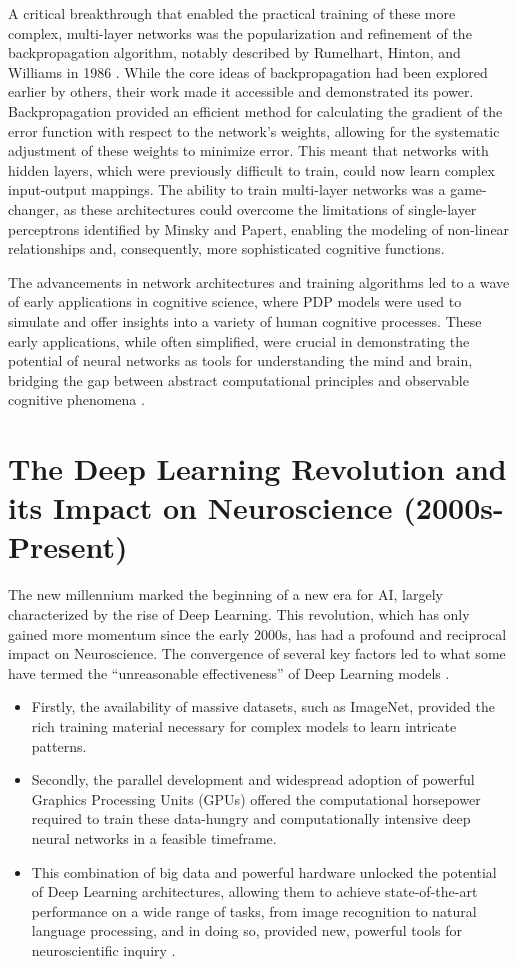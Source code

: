 A critical breakthrough that enabled the practical training of these more complex, multi-layer networks was the popularization and refinement of the backpropagation algorithm, notably described by Rumelhart, Hinton, and Williams in 1986 \cite{rumelhart1986learning}. While the core ideas of backpropagation had been explored earlier by others, their work made it accessible and demonstrated its power. Backpropagation provided an efficient method for calculating the gradient of the error function with respect to the network's weights, allowing for the systematic adjustment of these weights to minimize error. This meant that networks with hidden layers, which were previously difficult to train, could now learn complex input-output mappings. The ability to train multi-layer networks was a game-changer, as these architectures could overcome the limitations of single-layer perceptrons identified by Minsky and Papert, enabling the modeling of non-linear relationships and, consequently, more sophisticated cognitive functions.

The advancements in network architectures and training algorithms led to a wave of early applications in cognitive science, where PDP models were used to simulate and offer insights into a variety of human cognitive processes. These early applications, while often simplified, were crucial in demonstrating the potential of neural networks as tools for understanding the mind and brain, bridging the gap between abstract computational principles and observable cognitive phenomena \cite{mcclelland1986parallel}.

\section{The Deep Learning Revolution and its Impact on Neuroscience (2000s-Present)}\label{sec:2000s}

The new millennium marked the beginning of a new era for AI, largely characterized by the rise of Deep Learning. This revolution, which has only gained more momentum since the early 2000s, has had a profound and reciprocal impact on Neuroscience. The convergence of several key factors led to what some have termed the ``unreasonable effectiveness'' of Deep Learning models \cite{lecun2015deep}.
\begin{itemize}
    \item Firstly, the availability of massive datasets, such as ImageNet, provided the rich training material necessary for complex models to learn intricate patterns.
    \item Secondly, the parallel development and widespread adoption of powerful Graphics Processing Units (GPUs) offered the computational horsepower required to train these data-hungry and computationally intensive deep neural networks in a feasible timeframe.
    \item This combination of big data and powerful hardware unlocked the potential of Deep Learning architectures, allowing them to achieve state-of-the-art performance on a wide range of tasks, from image recognition to natural language processing, and in doing so, provided new, powerful tools for neuroscientific inquiry \cite{richards2019deep}.
\end{itemize}

